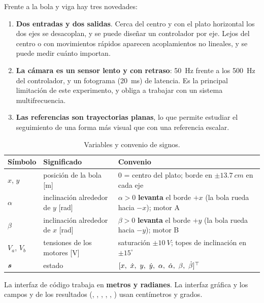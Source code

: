 Frente a la bola y viga hay tres novedades:
\begin{enumerate}
  \item \textbf{Dos entradas y dos salidas}. Cerca del centro y con el plato horizontal los dos ejes se desacoplan, y se puede diseñar un controlador por eje. Lejos del centro o con movimientos rápidos aparecen acoplamientos no lineales, y se puede medir cuánto importan.
  \item \textbf{La cámara es un sensor lento y con retraso}: \SI{50}{Hz} frente a los \SI{500}{Hz} del controlador, y un fotograma (\SI{20}{ms}) de latencia. Es la principal limitación de este experimento, y obliga a trabajar con un sistema multifrecuencia.
  \item \textbf{Las referencias son trayectorias planas}, lo que permite estudiar el seguimiento de una forma más visual que con una referencia escalar.
\end{enumerate}

\begin{table}[H]
\centering\small
\begin{tabular}{@{}lll@{}}
\toprule
Símbolo & Significado & Convenio\\
\midrule
$x$, $y$ & posición de la bola [m] & $0$ = centro del plato; borde en $\pm\SI{13.7}{cm}$ en cada eje\\
$\alpha$ & inclinación alrededor de $y$ [rad] & $\alpha>0$ \textbf{levanta} el borde $+x$ (la bola rueda hacia $-x$); motor A\\
$\beta$ & inclinación alrededor de $x$ [rad] & $\beta>0$ \textbf{levanta} el borde $+y$ (la bola rueda hacia $-y$); motor B\\
$V_a$, $V_b$ & tensiones de los motores [V] & saturación $\pm\SI{10}{V}$; topes de inclinación en $\pm15^\circ$\\
$\bm{s}$ & estado & $[x,\ \xd,\ y,\ \yd,\ \alpha,\ \ald,\ \beta,\ \bed]^\top$\\
\bottomrule
\end{tabular}
\caption{Variables y convenio de signos.}
\label{tab:convenio}
\end{table}

\begin{nota}
La interfaz de código trabaja en \textbf{metros y radianes}. La interfaz gráfica y los campos  y  de los resultados (, , , , , ) usan centímetros y grados.
\end{nota}

